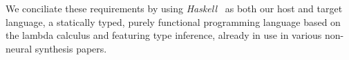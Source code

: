 \documentclass{article}
\begin{document}


We conciliate these requirements
by using \emph{Haskell}~\citep{jones2003haskell} as both our host and target language,
a statically typed, purely functional programming language based on the lambda calculus and featuring type inference,
already in use in various non-neural synthesis papers.%
~\citep{synquid,hornclauses,scythe,gissurarson2018suggesting}%

\end{document}
